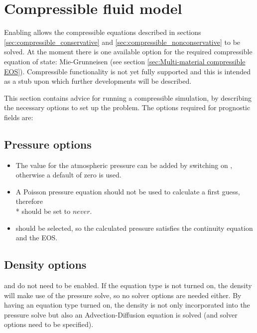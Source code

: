 \section{Compressible fluid model}

Enabling  allows the compressible equations described in sections 
\ref{sec:compressible_conservative} and \ref{sec:compressible_nonconservative} to be solved. At the moment there is one available option for the required 
compressible equation of state: Mie-Grunneisen (see section \ref{sec:Multi-material compressible EOS}).  Compressible functionality is not yet fully supported and this is intended as a stub upon which further developments will be described.

This section contains advice for running a compressible simulation, by describing the necessary options to set up the problem. The options required for prognostic fields are:

\subsection{Pressure options}
\begin{itemize}
\item The value for the atmospheric pressure can be added by switching on , otherwise a default of zero is used.
\item A Poisson pressure equation should not be used to calculate a first guess, therefore \\*  should be set to $never$.
\item {} should be selected, so the calculated pressure satisfies the continuity equation and the EOS.
\end{itemize}

\subsection{Density options}
 and  do not need to be enabled. If the equation type is not turned on, the density will make 
use of the pressure solve, so no solver options are needed either. By having an equation type turned on, the density is not only incorporated into the pressure solve 
but also an Advection-Diffusion equation is solved (and solver options need to be specified).

